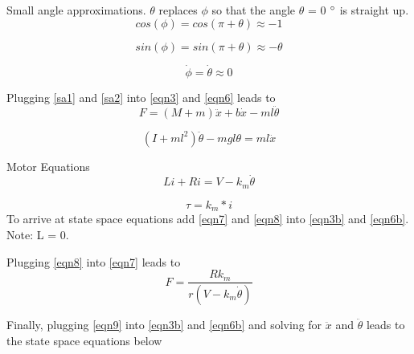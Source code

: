 \documentclass{article}
\begin{document}
Small angle approximations. $\theta$ replaces $\phi$ so that the angle $\theta$ = 0 $\degree$ is straight up.
\\

\begin{equation} 
\label{sa1}
cos(\phi) = cos(\pi + \theta) \approx -1
\end{equation}

\begin{equation} 
\label{sa2}
sin(\phi) = sin(\pi + \theta) \approx -\theta
\end{equation}

\begin{equation} 
\label{sa3}
\dot{\phi} = \dot{\theta} \approx 0
\end{equation}

Plugging \ref{sa1} and \ref{sa2} into \ref{eqn3} and \ref{eqn6} leads to
\begin{equation} 
\label{eqn3b}
F = (M+m)\ddot{x}+b\dot{x} -m l \ddot{\theta}
\end{equation}

\begin{equation} 
\label{eqn6b}
(I+m l^2)\ddot{\theta} - m g l\theta = m l \ddot{x}
\end{equation}

Motor Equations
\begin{equation} 
\label{eqn7}
L i + R i = V - k_m\dot{\theta}
\end{equation}

\begin{equation} 
\label{eqn8}
\tau = k_m*i
\end{equation}
To arrive at state space equations add \ref{eqn7} and \ref{eqn8} into \ref{eqn3b} and \ref{eqn6b}. Note: L = 0.

Plugging \ref{eqn8} into \ref{eqn7} leads to 
\begin{equation} 
\label{eqn9}
F = \frac{R k_m}{r(V-k_m\dot{\theta})}
\end{equation}

Finally, plugging \ref{eqn9} into \ref{eqn3b} and \ref{eqn6b} and solving for $\ddot{x}$ and $\ddot{\theta}$ leads to the state space equations below
\end{document}
